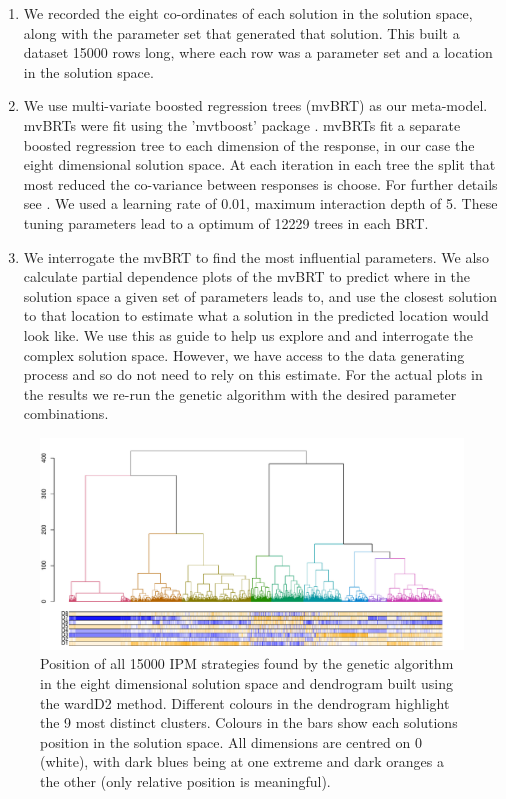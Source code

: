 \documentclass[12pt, a4paper]{article}
\begin{document}
\begin{enumerate}
\item We recorded the eight co-ordinates of each solution in the solution space, along with the parameter set that generated that solution. This built a dataset 15000 rows long, where each row was a parameter set and a location in the solution space.
\item We use multi-variate boosted regression trees (mvBRT) as our meta-model. mvBRTs were fit using the 'mvtboost' package \citep{Mill2016}. mvBRTs fit a separate boosted regression tree to each dimension of the response, in our case the eight dimensional solution space. At each iteration in each tree the split that most reduced the co-variance between responses is choose. For further details see \citep{Mill2016}. We used a learning rate of 0.01, maximum interaction depth of 5. These tuning parameters lead to a optimum of 12229 trees in each BRT.
\item We interrogate the mvBRT to find the most influential parameters. We also calculate partial dependence plots of the mvBRT to predict where in the solution space a given set of parameters leads to, and use the closest solution to that location to estimate what a solution in the predicted location would look like. We use this as guide to help us explore and and interrogate the complex solution space. However, we have access to the data generating process and so do not need to rely on this estimate. For the actual plots in the results we re-run the genetic algorithm with the desired parameter combinations.                  
\end{enumerate}       

\begin{figure}[!h]
	\includegraphics[width=170mm]{MS_figs/dend_9clust_NMDS_8D.pdf}
	\caption{Position of all 15000 IPM strategies found by the genetic algorithm in the eight dimensional solution space and dendrogram built using the wardD2 method. Different colours in the dendrogram highlight the 9 most distinct clusters. Colours in the bars show each solutions position in the solution space. All dimensions are centred on 0 (white), with dark blues being at one extreme and dark oranges a the other (only relative position is meaningful).} 
	\label{fig:clust_NMDS}
\end{figure}
\end{document}
